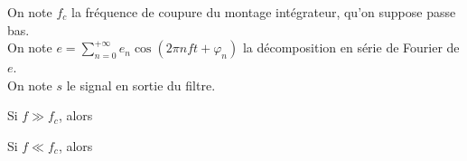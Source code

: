 \documentclass[a4paper]{article}
\begin{document}
\pagestyle{fancy}
\fancyhf{}
\setlength{\headheight}{15pt}

\begin{center}
	\large{}
\end{center}


On note \(f_c\) la fréquence de coupure du montage intégrateur, qu'on suppose passe bas.\\
On note \(e=\displaystyle\sum_{n=0}^{+\infty} e_n\cos(2\pi nft+\varphi_n)\) la décomposition en série de Fourier de \(e\).\\
On note \(s\) le signal en sortie du filtre.

Si \(f\gg f_c\), alors
\begin{center}
\end{center}
Si \(f\ll f_c\), alors
\begin{center}
\end{center}
\end{document}

